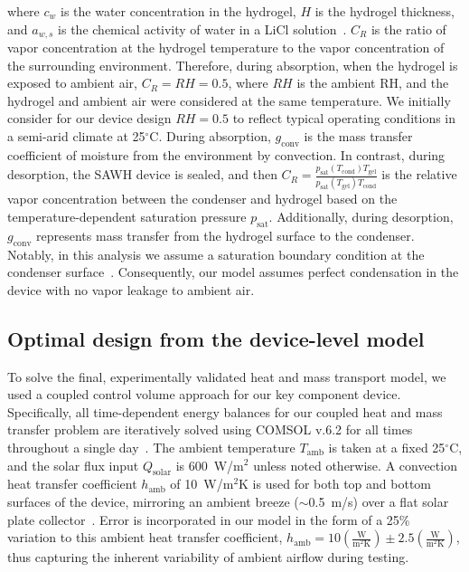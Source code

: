 \documentclass[11pt]{article}
\begin{document}
\noindent where $c_w$ is the water concentration in the hydrogel, $H$ is the hydrogel thickness, and $a_{w,s}$ is the chemical activity of water in a LiCl solution~\cite{campbell1979,atkins2006}. $C_R$ is the ratio of vapor concentration at the hydrogel temperature to the vapor concentration of the surrounding environment. Therefore, during absorption, when the hydrogel is exposed to ambient air, $C_R = RH = 0.5$, where $RH$ is the ambient RH, and the hydrogel and ambient air were considered at the same temperature. We initially consider for our device design $RH = 0.5$ to reflect typical operating conditions in a semi-arid climate at 25$^\circ$C. During absorption, $g_{\mathrm{conv}}$ is the mass transfer coefficient of moisture from the environment by convection. In contrast, during desorption, the SAWH device is sealed, and then $C_R = \frac{p_{\mathrm{sat}}(T_{\mathrm{cond}}) T_{\mathrm{gel}}}{p_{\mathrm{sat}}(T_{\mathrm{gel}}) T_{\mathrm{cond}}}$ is the relative vapor concentration between the condenser and hydrogel based on the temperature-dependent saturation pressure $p_{\mathrm{sat}}$. Additionally, during desorption, $g_{\mathrm{conv}}$ represents mass transfer from the hydrogel surface to the condenser. Notably, in this analysis we assume a saturation boundary condition at the condenser surface~\cite{lapotin2021,li2024b}. Consequently, our model assumes perfect condensation in the device with no vapor leakage to ambient air.

\subsection{Optimal design from the device-level model}

To solve the final, experimentally validated heat and mass transport model, we used a coupled control volume approach for our key component device. Specifically, all time-dependent energy balances for our coupled heat and mass transfer problem are iteratively solved using COMSOL v.6.2 for all times throughout a single day~\cite{comsol2021}. The ambient temperature $T_{\mathrm{amb}}$ is taken at a fixed 25$^\circ$C, and the solar flux input $Q_{\mathrm{solar}}$ is 600~W/m$^2$ unless noted otherwise. A convection heat transfer coefficient $h_{\mathrm{amb}}$ of 10~W/m$^2$K is used for both top and bottom surfaces of the device, mirroring an ambient breeze ($\sim$0.5~m/s) over a flat solar plate collector~\cite{uba2021}. Error is incorporated in our model in the form of a 25\% variation to this ambient heat transfer coefficient, $h_{\mathrm{amb}} = 10\left(\frac{\mathrm{W}}{\mathrm{m}^2\mathrm{K}}\right) \pm 2.5\left(\frac{\mathrm{W}}{\mathrm{m}^2\mathrm{K}}\right)$, thus capturing the inherent variability of ambient airflow during testing.
\end{document}
